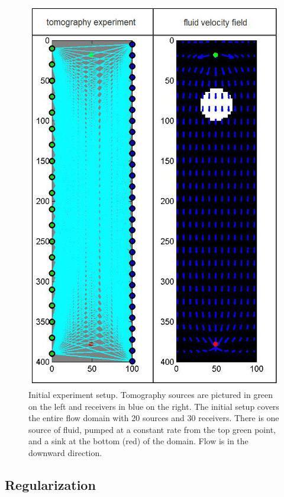 \documentclass[leqno,onefignum,onetabnum]{siamltexmm}
\begin{document}
\begin{figure}
	\renewcommand{\arraystretch}{1.5}
	\begin{center}
		\iwidth=90mm			
			\includegraphics[width=1\iwidth]{figures/initialSetUp}			
	\end{center}
\caption{Initial experiment setup. Tomography sources are pictured in green on the left and receivers in blue on the right. The initial setup covers the entire flow domain with 20 sources and 30 receivers. There is one source of fluid, pumped at a constant rate from the top green point, and a sink at the bottom (red) of the domain. Flow is in the downward direction. }
\label{fig:surveyDesign}
\end{figure}
\subsection{Regularization}
\end{document}
